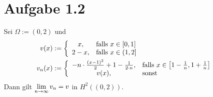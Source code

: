 \documentclass[12pt,a4paper]{article}
\begin{document}
\section*{Aufgabe 1.2}
Sei $\Omega:=(0,2)$ und 
\begin{align*}
v(x)&:=\left\lbrace\begin{array}{cl}
x, & \text{falls } x\in[0,1]\\
2-x, &\text{falls } x\in(1,2]
\end{array}\right.\\
v_n(x)&:=\left\lbrace\begin{array}{cl}
-n\cdot\frac{(x-1)^2}{2}+1-\frac{1}{2\cdot n}, & \text{falls } x\in\left[1-\frac{1}{n},1+\frac{1}{n}\right]\\
v(x),&\text{sonst }
\end{array}\right.\\
\end{align*}
Dann gilt $\lim\limits_{n\to\infty} v_n=v$ in $H^2((0,2))$.
\end{document}
